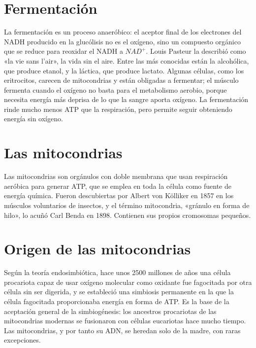 \documentclass{book}
\begin{document}

\section{Fermentación}

La fermentación es un proceso anaeróbico: el aceptor final de los electrones del NADH producido en la glucólisis no es el oxígeno, sino un compuesto orgánico que se reduce para reoxidar el NADH a \(NAD^{+}\). Louis Pasteur la describió como «la vie sans l'air», la vida sin el aire. Entre las más conocidas están la alcohólica, que produce etanol, y la láctica, que produce lactato. Algunas células, como los eritrocitos, carecen de mitocondrias y están obligadas a fermentar; el músculo fermenta cuando el oxígeno no basta para el metabolismo aerobio, porque necesita energía más deprisa de lo que la sangre aporta oxígeno. La fermentación rinde mucho menos ATP que la respiración, pero permite seguir obteniendo energía sin oxígeno.


\section{Las mitocondrias}

Las mitocondrias son orgánulos con doble membrana que usan respiración aeróbica para generar ATP, que se emplea en toda la célula como fuente de energía química. Fueron descubiertas por Albert von Kölliker en 1857 en los músculos voluntarios de insectos, y el término mitocondria, «gránulo en forma de hilo», lo acuñó Carl Benda en 1898. Contienen sus propios cromosomas pequeños.


\section{Origen de las mitocondrias}

Según la teoría endosimbiótica, hace unos 2500 millones de años una célula procariota capaz de usar oxígeno molecular como oxidante fue fagocitada por otra célula sin ser digerida, y se estableció una simbiosis permanente en la que la célula fagocitada proporcionaba energía en forma de ATP. Es la base de la aceptación general de la simbiogénesis: los ancestros procariotas de las mitocondrias modernas se fusionaron con células eucariotas hace mucho tiempo. Las mitocondrias, y por tanto su ADN, se heredan solo de la madre, con raras excepciones.
\end{document}
